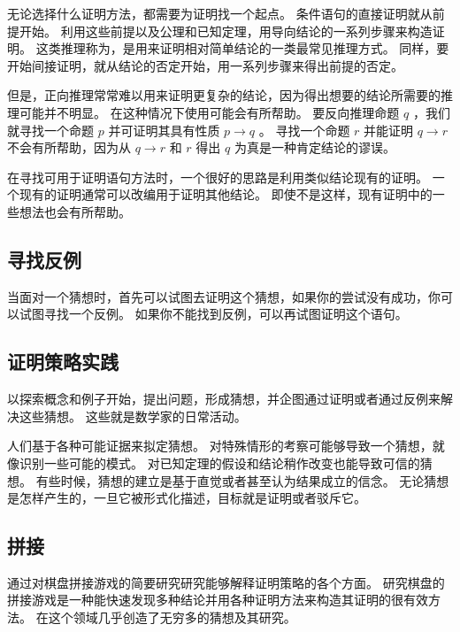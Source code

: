 {{        
        {
            无论选择什么证明方法，都需要为证明找一个起点。
            条件语句的直接证明就从前提开始。
            利用这些前提以及公理和已知定理，用导向结论的一系列步骤来构造证明。
            这类推理称为，是用来证明相对简单结论的一类最常见推理方式。
            同样，要开始间接证明，就从结论的否定开始，用一系列步骤来得出前提的否定。

            但是，正向推理常常难以用来证明更复杂的结论，因为得出想要的结论所需要的推理可能并不明显。
            在这种情况下使用可能会有所帮助。
            要反向推理命题 $q$ ，我们就寻找一个命题 $p$ 并可证明其具有性质 $p \rightarrow q$ 。
            寻找一个命题 $r$ 并能证明 $q \rightarrow r$ 不会有所帮助，因为从 $q \rightarrow r$ 和 $r$ 得出 $q$ 为真是一种肯定结论的谬误。
        }

        {
            在寻找可用于证明语句方法时，一个很好的思路是利用类似结论现有的证明。
            一个现有的证明通常可以改编用于证明其他结论。
            即使不是这样，现有证明中的一些想法也会有所帮助。
        }
    }

    \subsection{寻找反例}
    {
        当面对一个猜想时，首先可以试图去证明这个猜想，如果你的尝试没有成功，你可以试图寻找一个反例。
        如果你不能找到反例，可以再试图证明这个语句。
    }

    \subsection{证明策略实践}
    {
        以探索概念和例子开始，提出问题，形成猜想，并企图通过证明或者通过反例来解决这些猜想。
        这些就是数学家的日常活动。

        人们基于各种可能证据来拟定猜想。
        对特殊情形的考察可能够导致一个猜想，就像识别一些可能的模式。
        对已知定理的假设和结论稍作改变也能导致可信的猜想。
        有些时候，猜想的建立是基于直觉或者甚至认为结果成立的信念。
        无论猜想是怎样产生的，一旦它被形式化描述，目标就是证明或者驳斥它。
    }

    \subsection{拼接}
    {
        通过对棋盘拼接游戏的简要研究研究能够解释证明策略的各个方面。
        研究棋盘的拼接游戏是一种能快速发现多种结论并用各种证明方法来构造其证明的很有效方法。
        在这个领域几乎创造了无穷多的猜想及其研究。

}}
